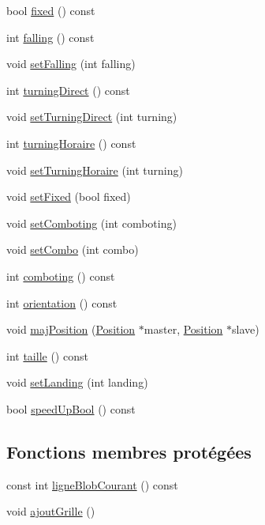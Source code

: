 \begin{DoxyCompactItemize}
\item 
bool \hyperlink{a00013_ae9c1c631f6aec115d9da860a2c117422}{fixed} () const 
\item 
int \hyperlink{a00013_aad81aa6262b2df09b7f5f6867b7d6948}{falling} () const 
\item 
void \hyperlink{a00013_a69eec554c4ffdb8814b53d4b6d81efc4}{setFalling} (int falling)
\item 
int \hyperlink{a00013_ab4e7eeb4a93c113b9baea02d20e9139e}{turningDirect} () const 
\item 
void \hyperlink{a00013_a918c18d9fc03eb66642acafb23563b09}{setTurningDirect} (int turning)
\item 
int \hyperlink{a00013_a605c22162ce9f303a92e23c7de5628d9}{turningHoraire} () const 
\item 
void \hyperlink{a00013_a7cf07be486ce2c669977fb58a57f6359}{setTurningHoraire} (int turning)
\item 
void \hyperlink{a00013_ab4729174c75f3bf9d0fe80804a97dc4a}{setFixed} (bool fixed)
\item 
void \hyperlink{a00013_a3f4bfe7f5bb26faa0cd7aaff389aafae}{setComboting} (int comboting)
\item 
void \hyperlink{a00013_a540eb7aa4aad37a5487ac0e4c91da903}{setCombo} (int combo)
\item 
int \hyperlink{a00013_a97d4047a17d5ef7e5be05b56e014d8b3}{comboting} () const 
\item 
int \hyperlink{a00013_a268b4af76d3a123c58bf3e74c34732d9}{orientation} () const 
\item 
void \hyperlink{a00013_a01eb529a43ee1e37c6a46339768ff406}{majPosition} (\hyperlink{a00014}{Position} $\ast$master, \hyperlink{a00014}{Position} $\ast$slave)
\item 
int \hyperlink{a00013_a187627c77d1f8f3abdfc943c78049036}{taille} () const 
\item 
void \hyperlink{a00013_a883ec44e96971e9b099b5e62dd2027f7}{setLanding} (int landing)
\item 
bool \hyperlink{a00013_a66cd74a97dbe962a642fd9112418bc6d}{speedUpBool} () const 
\end{DoxyCompactItemize}
\subsection*{Fonctions membres protégées}
\begin{DoxyCompactItemize}
\item 
const int \hyperlink{a00013_aa5c0b98ac8017941948a790736bec204}{ligneBlobCourant} () const 
\item 
void \hyperlink{a00013_aa9de1430d6438bd3d5c0ca6a8911e7ec}{ajoutGrille} ()
\end{DoxyCompactItemize}
